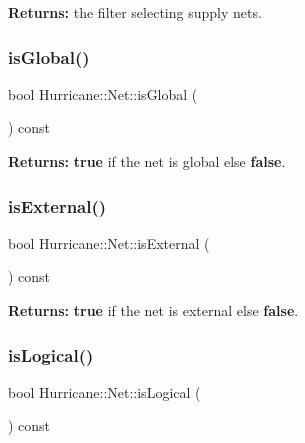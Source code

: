 {\bfseries Returns\+:} the filter selecting supply nets. \mbox{\label{classHurricane_1_1Net_a332e9b311809f75fc0fa3a5f36acebcc}} 
\subsubsection{\texorpdfstring{is\+Global()}{isGlobal()}}
{\footnotesize\ttfamily bool Hurricane\+::\+Net\+::is\+Global (\begin{DoxyParamCaption}{ }\end{DoxyParamCaption}) const\hspace{0.3cm}{\ttfamily [inline]}}

{\bfseries Returns\+:} {\bfseries true} if the net is global else {\bfseries false}. \mbox{\label{classHurricane_1_1Net_aeeb3735dd7451bc0054dd68ac21aae47}} 
\subsubsection{\texorpdfstring{is\+External()}{isExternal()}}
{\footnotesize\ttfamily bool Hurricane\+::\+Net\+::is\+External (\begin{DoxyParamCaption}{ }\end{DoxyParamCaption}) const\hspace{0.3cm}{\ttfamily [inline]}}

{\bfseries Returns\+:} {\bfseries true} if the net is external else {\bfseries false}. \mbox{\label{classHurricane_1_1Net_a9caf25bfa84478157d206979dd521ed4}} 
\subsubsection{\texorpdfstring{is\+Logical()}{isLogical()}}
{\footnotesize\ttfamily bool Hurricane\+::\+Net\+::is\+Logical (\begin{DoxyParamCaption}{ }\end{DoxyParamCaption}) const\hspace{0.3cm}{\ttfamily [inline]}}

